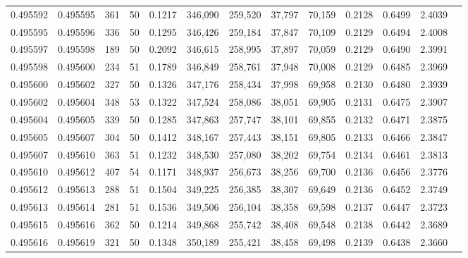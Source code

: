 \begin{tabular}{rrrrrrrrrrrrr}
0.495592 & 0.495595 &   361 &  50 &                                     0.1217 & 346,090 & 259,520 &  37,797 &  70,159 & 0.2128 & 0.6499 & 2.4039 \\
0.495595 & 0.495596 &   336 &  50 &                                     0.1295 & 346,426 & 259,184 &  37,847 &  70,109 & 0.2129 & 0.6494 & 2.4008 \\
0.495597 & 0.495598 &   189 &  50 &                                     0.2092 & 346,615 & 258,995 &  37,897 &  70,059 & 0.2129 & 0.6490 & 2.3991 \\
0.495598 & 0.495600 &   234 &  51 &                                     0.1789 & 346,849 & 258,761 &  37,948 &  70,008 & 0.2129 & 0.6485 & 2.3969 \\
0.495600 & 0.495602 &   327 &  50 &                                     0.1326 & 347,176 & 258,434 &  37,998 &  69,958 & 0.2130 & 0.6480 & 2.3939 \\
0.495602 & 0.495604 &   348 &  53 &                                     0.1322 & 347,524 & 258,086 &  38,051 &  69,905 & 0.2131 & 0.6475 & 2.3907 \\
0.495604 & 0.495605 &   339 &  50 &                                     0.1285 & 347,863 & 257,747 &  38,101 &  69,855 & 0.2132 & 0.6471 & 2.3875 \\
0.495605 & 0.495607 &   304 &  50 &                                     0.1412 & 348,167 & 257,443 &  38,151 &  69,805 & 0.2133 & 0.6466 & 2.3847 \\
0.495607 & 0.495610 &   363 &  51 &                                     0.1232 & 348,530 & 257,080 &  38,202 &  69,754 & 0.2134 & 0.6461 & 2.3813 \\
0.495610 & 0.495612 &   407 &  54 &                                     0.1171 & 348,937 & 256,673 &  38,256 &  69,700 & 0.2136 & 0.6456 & 2.3776 \\
0.495612 & 0.495613 &   288 &  51 &                                     0.1504 & 349,225 & 256,385 &  38,307 &  69,649 & 0.2136 & 0.6452 & 2.3749 \\
0.495613 & 0.495614 &   281 &  51 &                                     0.1536 & 349,506 & 256,104 &  38,358 &  69,598 & 0.2137 & 0.6447 & 2.3723 \\
0.495615 & 0.495616 &   362 &  50 &                                     0.1214 & 349,868 & 255,742 &  38,408 &  69,548 & 0.2138 & 0.6442 & 2.3689 \\
0.495616 & 0.495619 &   321 &  50 &                                     0.1348 & 350,189 & 255,421 &  38,458 &  69,498 & 0.2139 & 0.6438 & 2.3660 \\

\end{tabular}
